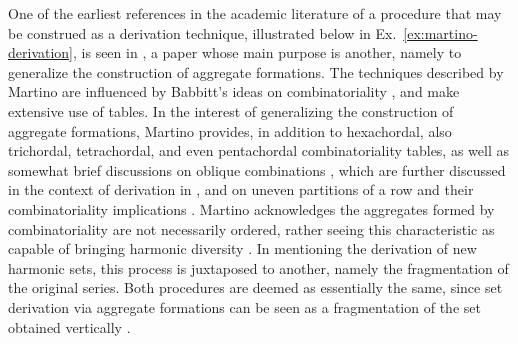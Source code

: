 One of the earliest references in the academic literature of a procedure that may be construed as a derivation technique, illustrated below in Ex.~\ref{ex:martino-derivation}, is seen in \cite{Martino1961}, a paper whose main purpose is another, namely to generalize the construction of aggregate formations. The techniques described by Martino are influenced by Babbitt's ideas on combinatoriality \cite[224]{Martino1961}, and make extensive use of tables. In the interest of generalizing the construction of aggregate formations, Martino provides, in addition to hexachordal, also trichordal, tetrachordal, and even pentachordal combinatoriality tables, as well as somewhat brief discussions on oblique combinations \cite[241]{Martino1961}, which are further discussed in the context of derivation in \cite[216]{Starr1984}, and on uneven partitions of a row and their combinatoriality implications \cite[267]{Martino1961}. Martino acknowledges the aggregates formed by combinatoriality are not necessarily ordered, rather seeing this characteristic as capable of bringing harmonic diversity \cite[228, 230]{Martino1961}. In mentioning the derivation of new harmonic sets, this process is juxtaposed to another, namely the fragmentation of the original series. Both procedures are deemed as essentially the same, since set derivation via aggregate formations can be seen as a fragmentation of the set obtained vertically \cite[230, 231]{Martino1961}.

